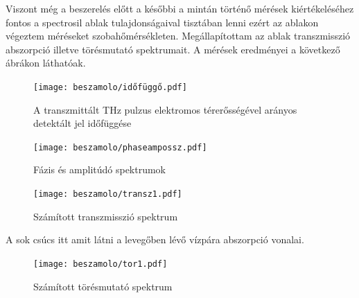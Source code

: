 \documentclass[a4paper,12pt]{article}
\numberwithin{equation}{section}
\begin{document}
Viszont még a beszerelés előtt a későbbi a mintán történő mérések kiértékeléséhez fontos a spectrosil ablak tulajdonságaival tisztában lenni ezért az ablakon végeztem méréseket szobahőmérsékleten. Megállapítottam az ablak transzmisszió abszorpció illetve törésmutató spektrumait. A mérések eredményei a következő ábrákon láthatóak.



\begin{figure}[H]
\begin{center}


\texttt{[image: beszamolo/időfüggő.pdf]}




\end{center}
\caption{A transzmittált THz pulzus elektromos térerősségével arányos detektált jel időfüggése}

\label{fig:ido}
\end{figure}

\begin{figure}[H]
\begin{center}


\texttt{[image: beszamolo/phaseampossz.pdf]}




\end{center}
\caption{Fázis és amplitúdó spektrumok}

\label{fig:spektr}
\end{figure}






\begin{figure}[H]
\begin{center}


\texttt{[image: beszamolo/transz1.pdf]}




\end{center}
\caption{Számított transzmisszió spektrum}

\label{fig:transz1}
\end{figure}

A sok csúcs itt amit látni a levegőben lévő vízpára abszorpció vonalai.





\begin{figure}[H]
\begin{center}


\texttt{[image: beszamolo/tor1.pdf]}




\end{center}
\caption{Számított törésmutató spektrum}

\label{fig:tor}
\end{figure}
\end{document}
